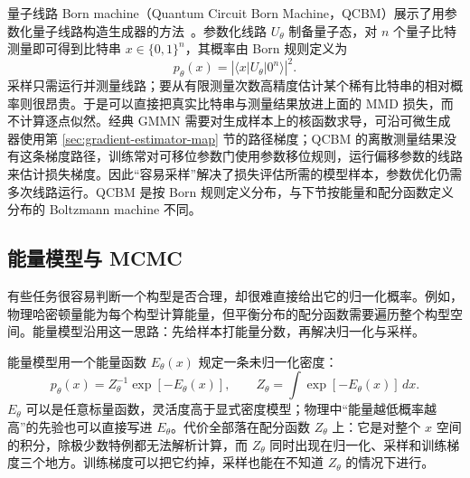 量子线路 Born machine（Quantum Circuit Born Machine，QCBM）展示了用参数化量子线路构造生成器的方法~\cite{liu2018qcbm}。参数化线路 \(U_\theta\) 制备量子态，对 \(n\) 个量子比特测量即可得到比特串 \(x\in\{0,1\}^n\)，其概率由 Born 规则定义为
\begin{equation}
 p_\theta(x)=\left|\langle x|U_\theta|0^n\rangle\right|^2.
\end{equation}
采样只需运行并测量线路；要从有限测量次数高精度估计某个稀有比特串的相对概率则很昂贵。于是可以直接把真实比特串与测量结果放进上面的 MMD 损失，而不计算逐点似然。经典 GMMN 需要对生成样本上的核函数求导，可沿可微生成器使用第 \ref{sec:gradient-estimator-map} 节的路径梯度；QCBM 的离散测量结果没有这条梯度路径，训练常对可移位参数门使用参数移位规则，运行偏移参数的线路来估计损失梯度。因此“容易采样”解决了损失评估所需的模型样本，参数优化仍需多次线路运行。QCBM 是按 Born 规则定义分布，与下节按能量和配分函数定义分布的 Boltzmann machine 不同。

\subsection{能量模型与 MCMC}
\label{sec:ebm-mcmc}

有些任务很容易判断一个构型是否合理，却很难直接给出它的归一化概率。例如，物理哈密顿量能为每个构型计算能量，但平衡分布的配分函数需要遍历整个构型空间。能量模型沿用这一思路：先给样本打能量分数，再解决归一化与采样。

能量模型用一个能量函数 \(E_\theta(x)\) 规定一条未归一化密度：
\begin{equation}
 p_\theta(x)=Z_\theta^{-1}\exp[-E_\theta(x)],\qquad
 Z_\theta=\int\exp[-E_\theta(x)]\,dx.
\end{equation}
\(E_\theta\) 可以是任意标量函数，灵活度高于显式密度模型；物理中“能量越低概率越高”的先验也可以直接写进 \(E_\theta\)。代价全部落在配分函数 \(Z_\theta\) 上：它是对整个 \(x\) 空间的积分，除极少数特例都无法解析计算，而 \(Z_\theta\) 同时出现在归一化、采样和训练梯度三个地方。训练梯度可以把它约掉，采样也能在不知道 \(Z_\theta\) 的情况下进行。

